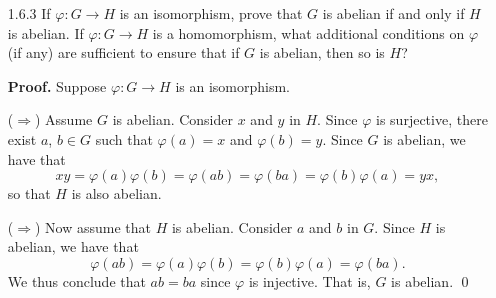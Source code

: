 \begin{enumerate}
      \textbf{Proof.} Assume that $\varphi : G \rightarrow H$ is a group
      isomorphism. Let $x \in G$. Suppose $|x| = n \in \Z^+$. By the preceding 
      exercise, we have that $\varphi(x)^n = \varphi(x^n) = \varphi(1) = 1$, so 
      that $|\varphi(x)| \le n$. Now suppose that $|\varphi(x)| = m < n$. Then
      we must have that $\varphi(1) = 1 = \varphi(x)^m = \varphi(x^m)$. That is,
      $x^m = 1$ (since $\varphi$ is injective), a contradiction since $|x| = n$.
      Thus $|\varphi(x)| = |x| = n$. Finally suppose that $|x| = \infty$ and
      $|\varphi(x)| = r < \infty$. Then, as previously argued, we must have
      that $x^r = 1$, a contradiction. Thus if $y \in G$, it must follow that
      $|y| = |\varphi(y)|$. \qed

      For a positive integer $n$, we can now exhibit a bijection (using
      $\varphi$) between the elements of $G$ of order $n$ and the elements of
      $H$ of order $n$. Thus any two isomorphic groups must have the same number 
      of elements of order $n$ for each $n \in \Z^+$. If $\varphi$ is only 
      assumed to be a homomorphism then the result is not generally true. 
      Consider the homomorphism
      $$\alpha : S_3 \rightarrow \{1\}.$$
      Although $S_3$ has an element of order 2, the trivial group $\{1\}$ has no 
      element of order 2.
   \item[1.6.3]   If $\varphi : G \rightarrow H$ is an isomorphism, prove that
                  $G$ is abelian if and only if $H$ is abelian. If
                  $\varphi : G \rightarrow H$ is a homomorphism, what additional
                  conditions on $\varphi$ (if any) are sufficient to ensure that
                  if $G$ is abelian, then so is $H$?

      \textbf{Proof.} Suppose $\varphi : G \rightarrow H$ is an isomorphism.

      ($\Rightarrow$) Assume $G$ is abelian. Consider $x$ and $y$ in $H$. Since
      $\varphi$ is surjective, there exist $a$, $b \in G$ such that
      $\varphi(a) = x$ and $\varphi(b) = y$. Since $G$ is abelian, we have that
      $$xy = \varphi(a)\varphi(b) = \varphi(ab) = \varphi(ba) = 
        \varphi(b)\varphi(a) = yx,$$
      so that $H$ is also abelian.

      ($\Rightarrow$) Now assume that $H$ is abelian. Consider $a$ and $b$ 
      in $G$. Since $H$ is abelian, we have that
      $$\varphi(ab) = \varphi(a)\varphi(b) = \varphi(b)\varphi(a) =
        \varphi(ba).$$
      We thus conclude that $ab = ba$ since $\varphi$ is injective. That is, $G$ 
      is abelian. \qed


\end{enumerate}
